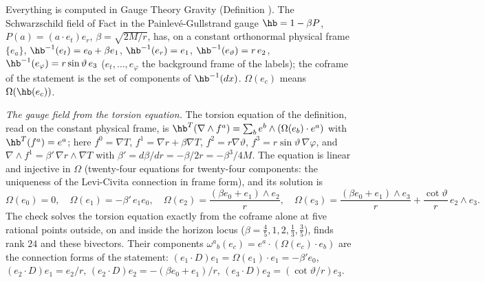 Everything is computed in Gauge Theory Gravity (Definition ). The Schwarzschild field of Fact  in the Painlev\'e-Gullstrand gauge $\hb = 1 - \beta P$, $P(a) = (a\cdot e_{t})e_{r}$, $\beta = \sqrt{2M/r}$, has, on a constant orthonormal physical frame $\{e_{a}\}$, $\hb^{-1}(e_{t}) = e_{0} + \beta e_{1}$, $\hb^{-1}(e_{r}) = e_{1}$, $\hb^{-1}(e_{\vartheta}) = r\,e_{2}$, $\hb^{-1}(e_{\varphi}) = r\sin\vartheta\,e_{3}$ ($e_{t}, \dots, e_{\varphi}$ the background frame of the labels); the coframe of the statement is the set of components of $\hb^{-1}(dx)$. $\Omega(e_{c})$ means $\Omega(\hb(e_{c}))$.

\emph{The gauge field from the torsion equation.} The torsion equation of the definition, read on the constant physical frame, is $\hb^{T}(\nabla\wedge f^{a}) = \sum_{b} e^{b}\wedge(\Omega(e_{b})\cdot e^{a})$ with $\hb^{T}(f^{a}) = e^{a}$; here $f^{0} = \nabla T$, $f^{1} = \nabla r + \beta\nabla T$, $f^{2} = r\nabla\vartheta$, $f^{3} = r\sin\vartheta\,\nabla\varphi$, and $\nabla\wedge f^{1} = \beta'\,\nabla r\wedge\nabla T$ with $\beta' = d\beta/dr = -\beta/2r = -\beta^{3}/4M$. The equation is linear and injective in $\Omega$ (twenty-four equations for twenty-four components: the uniqueness of the Levi-Civita connection in frame form), and its solution is
\[
\Omega(e_{0}) = 0, \quad \Omega(e_{1}) = -\beta'\,e_{1}e_{0}, \quad \Omega(e_{2}) = \frac{(\beta e_{0} + e_{1})\wedge e_{2}}{r}, \quad \Omega(e_{3}) = \frac{(\beta e_{0} + e_{1})\wedge e_{3}}{r} + \frac{\cot\vartheta}{r}\,e_{2}\wedge e_{3}.
\]
The check solves the torsion equation exactly from the coframe alone at five rational points outside, on and inside the horizon locus ($\beta = \tfrac45, 1, 2, \tfrac13, \tfrac35$), finds rank $24$ and these bivectors. Their components $\omega^{a}{}_{b}(e_{c}) = e^{a}\cdot(\Omega(e_{c})\cdot e_{b})$ are the connection forms of the statement: $(e_{1}\cdot D)e_{1} = \Omega(e_{1})\cdot e_{1} = -\beta' e_{0}$, $(e_{2}\cdot D)e_{1} = e_{2}/r$, $(e_{2}\cdot D)e_{2} = -(\beta e_{0} + e_{1})/r$, $(e_{3}\cdot D)e_{2} = (\cot\vartheta/r)e_{3}$.

